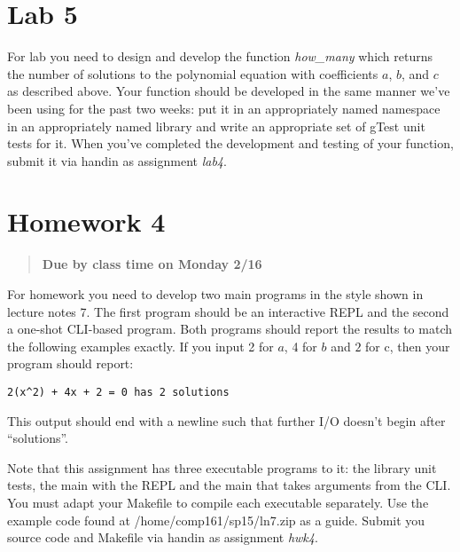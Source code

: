 \documentclass[]{tufte-handout}
\begin{document}
\section{Lab 5}

For lab you need to design and develop the function \textit{how\_many} which returns the number of solutions to the polynomial equation with coefficients $a$, $b$, and $c$ as described above. Your function should be developed in the same manner we've been using for the past two weeks: put it in an appropriately named namespace in an appropriately named library and write an appropriate set of gTest unit tests for it.  When you've completed the development and testing of your function, submit it via handin as assignment \textit{lab4}.

\section{Homework 4}

\begin{framed}
\begin{quote}
\textbf{Due by class time on Monday 2/16}
\end{quote}
\end{framed}

For homework you need to develop two main programs in the style shown in lecture notes 7. The first program should be an interactive REPL and the second a one-shot CLI-based program. Both programs should report the results to match the following examples exactly.  If you input 2 for $a$, 4 for $b$ and $2$ for c, then your program should report:
\begin{verbatim}
2(x^2) + 4x + 2 = 0 has 2 solutions
\end{verbatim}
This output should end with a newline such that further I/O doesn't begin after ``solutions''.

Note that this assignment has three executable programs to it: the library unit tests, the main with the REPL and the main that takes arguments from the CLI. You must adapt your Makefile to compile each executable separately. Use the example code found at /home/comp161/sp15/ln7.zip as a guide.  Submit you source code and Makefile via handin as assignment \textit{hwk4}.
\end{document}

